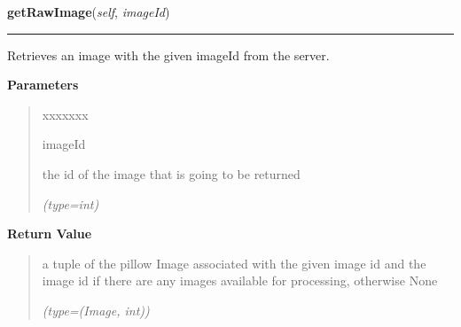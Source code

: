 \hspace{.8\funcindent}\begin{boxedminipage}{\funcwidth}

    \raggedright \textbf{getRawImage}(\textit{self}, \textit{imageId})

    \vspace{-1.5ex}

    \rule{\textwidth}{0.5\fboxrule}
\setlength{\parskip}{2ex}
    Retrieves an image with the given imageId from the server.

\setlength{\parskip}{1ex}
      \textbf{Parameters}
      \vspace{-1ex}

      \begin{quote}
        \begin{Ventry}{xxxxxxx}

          \item[imageId]

          the id of the image that is going to be returned

            {\it (type=int)}

        \end{Ventry}

      \end{quote}

      \textbf{Return Value}
    \vspace{-1ex}

      \begin{quote}
      a tuple of the pillow Image associated with the given image id and 
      the image id if there are any images available for processing, 
      otherwise None

      {\it (type=(Image, int))}

      \end{quote}

    \end{boxedminipage}

    \label{client_rest:ImagingInterface:getNextRawImage}

    \vspace{0.5ex}

